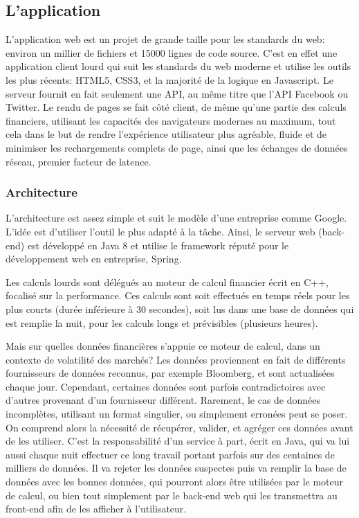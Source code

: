 \documentclass[a4paper,french,12pt]{article}
\begin{document}
	\subsection{L'application}
		  L'application web est un projet de grande taille pour les standards du web: environ un millier de fichiers et 15000 lignes de code source. 
		  C'est en effet une application client lourd qui suit les standards du web moderne et utilise les outils les plus récents: HTML5, CSS3, et la majorité de la logique en Javascript. Le serveur fournit en fait seulement une API, au même titre que l'API Facebook ou Twitter.
		  Le rendu de pages se fait côté client, de même qu'une partie des calculs financiers, utilisant les capacités des navigateurs modernes au maximum, tout cela dans le but de rendre l'expérience utilisateur plus agréable, fluide et de minimiser les rechargements complets de page, ainsi que les échanges de données réseau, premier facteur de latence.

		\subsubsection{Architecture}
		
		L'architecture est assez simple et suit le modèle d'une entreprise comme Google. L'idée est d'utiliser l'outil le plus adapté à la tâche.
		Ainsi, le serveur web (back-end) est développé en Java 8 et utilise le framework réputé pour le développement web en entreprise, Spring.
		
		Les calculs lourds sont délégués au moteur de calcul financier écrit en C++, focalisé sur la performance. Ces calculs sont soit effectués en temps réels pour les plus courts (durée inférieure à 30 secondes), soit lus dans une base de données qui est remplie la nuit, pour les calculs longs et prévisibles (plusieurs heures).
		
		Mais sur quelles données financières s'appuie ce moteur de calcul, dans un contexte de volatilité des marchés?
		Les données proviennent en fait de différents fournisseurs de données reconnus, par exemple Bloomberg, et sont actualisées chaque jour. Cependant, certaines données sont parfois contradictoires avec d'autres provenant d'un fournisseur différent. Rarement, le cas de données incomplètes, utilisant un format singulier, ou simplement erronées peut se poser. 
		On comprend alors la nécessité de récupérer, valider, et agréger ces données avant de les utiliser. C'est la responsabilité d'un service à part, écrit en Java, qui va lui aussi chaque nuit effectuer ce long travail portant parfois sur des centaines de milliers de données. Il va rejeter les données suspectes puis va remplir la base de données avec les bonnes données, qui pourront alors être utilisées par le moteur de calcul, ou bien tout simplement par le back-end web qui les transmettra au front-end afin de les afficher à l'utilisateur.
	
\end{document}
